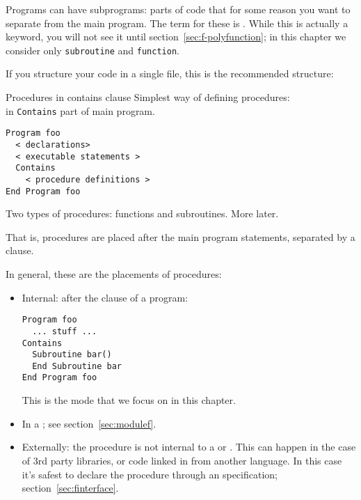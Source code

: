 
Programs can have subprograms: parts of code that for some reason you
want to separate from the main program. The term for these is
.
While this is actually a keyword, you will not see it
until section~\ref{sec:f-polyfunction};
in this chapter we consider only \lstinline{subroutine} and \lstinline{function}.

If you structure your code in a single
file, this is the recommended structure:

\begin{block}{Procedures in contains clause}
  \label{sl:contains}
  Simplest way of defining procedures:\\
  in \lstinline{Contains} part of main program.
\begin{lstlisting}
Program foo
  < declarations>
  < executable statements >
  Contains
    < procedure definitions >
End Program foo
\end{lstlisting}
Two types of procedures: functions and subroutines. More later.
\end{block}

That is, procedures are placed after the main program statements,
separated by a  clause.

In general, these are the  placements of procedures:
\begin{itemize}
\item Internal: after the  clause of a program:
\begin{lstlisting}
Program foo
  ... stuff ...
Contains
  Subroutine bar()
  End Subroutine bar
End Program foo
\end{lstlisting}
This is the mode that we focus on in this chapter.
\item In a ; see section~\ref{sec:modulef}.
\item Externally: the procedure is not internal to a  or
  .
  This can happen in the case of 3rd party libraries, or
  code linked in from another language.
  In this case it's safest to declare the procedure through an
   specification; section~\ref{sec:finterface}.
\end{itemize}

